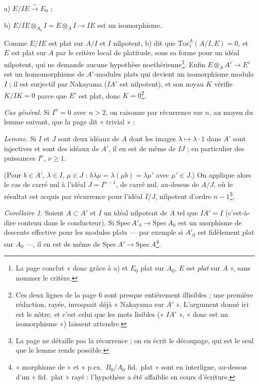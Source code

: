 \documentclass[11pt,a4paper]{article}
\begin{document}
a) $E/IE \xrightarrow{\sim} E_0$ ;

b) $E/IE \otimes_{A_0} I = E \otimes_A I \to IE$ est un isomorphisme.

Comme $E/IE$ est plat sur $A/I$ et $I$ nilpotent, b) dit que
$\mathrm{Tor}^A_1(A/I, E) = 0$, et $E$ est plat sur $A$ par le critère local
de platitude, sous sa forme pour un idéal nilpotent, qui ne demande aucune
hypothèse noethérienne\footnote{La page conclut « donc grâce à a) et $E_0$
plat sur $A_0$, $E$ est \emph{plat} sur $A$ », sans nommer le critère.}.
Enfin $E \otimes_A A' \to E'$ est un homomorphisme de $A'$-modules plats qui
devient un isomorphisme modulo $I$ ; il est surjectif par Nakayama ($IA'$
est nilpotent), et son noyau $K$ vérifie $K/IK = 0$ parce que $E'$ est plat,
donc $K = 0$\footnote{Ces deux lignes de la page 6 sont presque entièrement
illisibles ; une première rédaction, rayée, invoquait déjà « Nakayama sur
$A'$ ». L'argument donné ici est le nôtre, et c'est celui que les mots lisibles
(« $IA'$ », « donc est un isomorphisme ») laissent attendre.}.

\emph{Cas général.} Si $I^n = 0$ avec $n > 2$, on raisonne par récurrence sur
$n$, au moyen du lemme suivant, que la page dit « trivial » :

\emph{Lemme.} Si $I$ et $J$ sont deux idéaux de $A$ dont les images
$\lambda \mapsto \lambda \cdot 1$ dans $A'$ sont injectives et sont des idéaux
de $A'$, il en est de même de $IJ$ ; en particulier des puissances $I^{\nu}$,
$\nu \geqslant 1$.

(Pour $b \in A'$, $\lambda \in I$, $\mu \in J$ : $b \lambda\mu = \lambda (\mu
b) = \lambda \mu'$ avec $\mu' \in J$.) On applique alors le cas de carré nul
à l'idéal $J = I^{n-1}$, de carré nul, au-dessus de $A/J$, où le résultat est
acquis par récurrence pour l'idéal $I/J$, nilpotent d'ordre $n-1$\footnote{La
page ne détaille pas la récurrence ; on en écrit le découpage, qui est le
seul que le lemme rende possible.}.

\emph{Corollaire 1.} Soient $A \subset A'$ et $I$ un idéal nilpotent de $A$
tel que $IA' = I$ (c'est-à-dire contenu dans le conducteur). Si
$\mathrm{Spec}\, A'_0 \to \mathrm{Spec}\, A_0$ est un morphisme de descente
effective pour les modules plats — par exemple si $A'_0$ est fidèlement plat
sur $A_0$ —, il en est de même de $\mathrm{Spec}\, A' \to \mathrm{Spec}\,
A$\footnote{« morphisme de » et « p.ex.\ $B_0/A_0$ fid.\ plat » sont en
interligne, au-dessus d'un « fid.\ plat » rayé : l'hypothèse a été
affaiblie en cours d'écriture.}.
\end{document}
